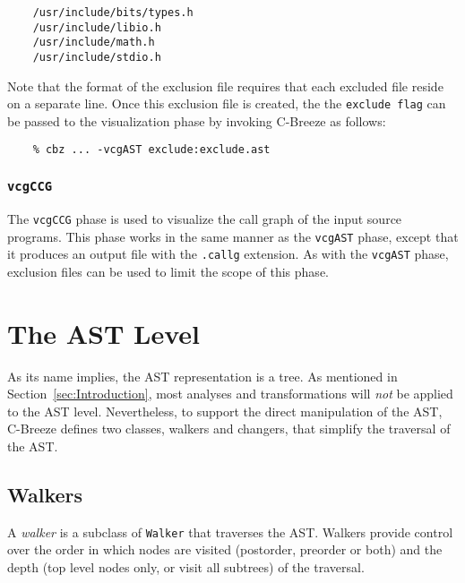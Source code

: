\documentclass[10pt]{article}
\begin{document}
\begin{small}
\begin{verbatim}
    /usr/include/bits/types.h
    /usr/include/libio.h
    /usr/include/math.h
    /usr/include/stdio.h
\end{verbatim}
\end{small}

\noindent
Note that the format of the exclusion file requires that each excluded
file reside on a separate line.  Once this exclusion file is created, the
the {\tt exclude flag} can be passed to the visualization phase by invoking
C-Breeze as follows:

\begin{small}
\begin{verbatim}
    % cbz ... -vcgAST exclude:exclude.ast
\end{verbatim}
\end{small}


\subsubsection{{\tt vcgCCG}}

The {\tt vcgCCG} phase is used to visualize the call graph of the input
source programs.  This phase works in the same manner as the {\tt vcgAST}
phase, except that it produces an output file with the {\tt .callg}
extension.  As with the {\tt vcgAST} phase, exclusion files can be used to
limit the scope of this phase.


\section{The AST Level}

As its name implies, the AST representation is a tree.  As mentioned in
Section~\ref{sec:Introduction}, most analyses and transformations will {\em
not} be applied to the AST level.  Nevertheless, to support the direct
manipulation of the AST, C-Breeze defines two classes, walkers and changers,
that simplify the traversal of the AST.

\subsection{Walkers}

A {\em walker} is a subclass of {\tt Walker} that traverses the AST.  Walkers
provide control over the order in which nodes are visited (postorder,
preorder or both) and the depth (top level nodes only, or visit all subtrees)
of the traversal.
\end{document}
